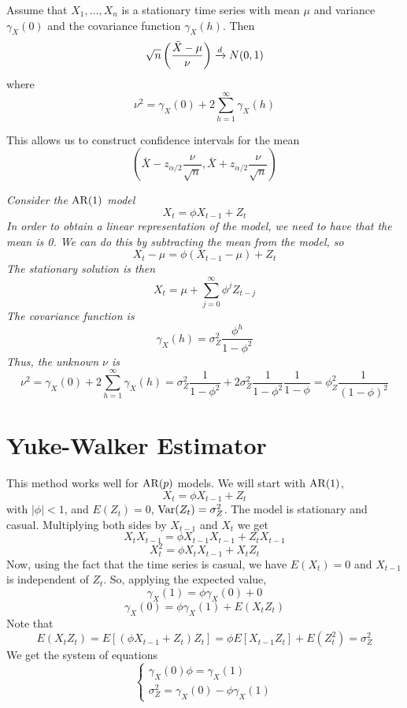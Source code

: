 \begin{lemma}
    Assume that $X_1, \ldots, X_n$ is a stationary time series with mean $\mu$ and variance $\gamma_X(0)$ and the covariance function $\gamma_X(h)$. Then 
    \[\sqrt{n}\left(\frac{\bar{X}-\mu}{\nu}\right) \xrightarrow{d} N(0,1)\]
    where 
    \[\nu^2 = \gamma_X(0) + 2\sum_{h=1}^\infty \gamma_X(h)\]
\end{lemma}

This allows us to construct confidence intervals for the mean 
\[\left(\bar{X} - z_{\alpha/2}\frac{\nu}{\sqrt{n}}, \bar{X} + z_{\alpha/2}\frac{\nu}{\sqrt{n}}\right)\]

\begin{example}
    \emph{
        Consider the $\operatorname{AR}(1)$ model
        \[X_t = \phi X_{t-1} + Z_t\]
        In order to obtain a linear representation of the model, we need to have that the mean is 0. We can do this by subtracting the mean from the model, so
        \[X_t - \mu = \phi(X_{t-1} - \mu) + Z_t\]
        The stationary solution is then 
        \[X_t = \mu + \sum_{j=0}^\infty \phi^j Z_{t-j}\]
        The covariance function is
        \[\gamma_X(h) = \sigma_Z^2\frac{\phi^h}{1-\phi^2}\]
        Thus, the unknown $\nu$ is 
        \[\nu^2 = \gamma_X(0) + 2\sum_{h=1}^\infty \gamma_X(h) = \sigma_Z^2\frac{1}{1-\phi^2} + 2\sigma_Z^2\frac{1}{1-\phi^2}\frac{1}{1-\phi} = \phi_Z^2\frac{1}{(1-\phi)^2}\]
    }
\end{example}

\section{Yuke-Walker Estimator}

This method works well for $\operatorname{AR}(p)$ models. We will start with $\operatorname{AR}(1)$,
\[X_t = \phi X_{t-1} + Z_t\]
with $|\phi| < 1$, and $E(Z_t) = 0$, $\operatorname{Var}(Z_t) = \sigma_Z^2$. The model is stationary and casual. Multiplying both sides by $X_{t-1}$ and $X_t$ we get 
\[X_tX_{t-1} = \phi X_{t-1} X_{t-1} + Z_tX_{t-1}\]
\[X_t^2 = \phi X_t X_{t-1} + X_t Z_t\]
Now, using the fact that the time series is casual, we have $E(X_t) = 0$ and $X_{t-1}$ is independent of $Z_t$. So, applying the expected value,
\[\gamma_X(1) = \phi \gamma_X(0) + 0\]
\[\gamma_X(0) = \phi \gamma_X(1) + E(X_tZ_t)\]
Note that 
\[E(X_tZ_t) = E[(\phi X_{t-1}+Z_t)Z_t] = \phi E[X_{t-1}Z_t] + E(Z_t^2) = \sigma_Z^2\]
We get the system of equations 
\[\begin{cases}
    \gamma_X(0)\phi = \gamma_X(1)\\
    \sigma_Z^2 = \gamma_X(0) - \phi \gamma_X(1)
\end{cases}\]

